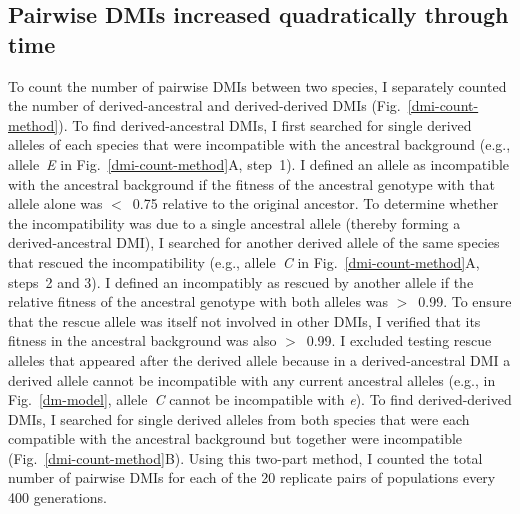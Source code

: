 \begin{doublespace}
\subsection{Pairwise DMIs increased quadratically through time}

To count the number of pairwise DMIs between two species,
I separately counted the number of derived-ancestral
and derived-derived DMIs (Fig.~\ref{dmi-count-method}).
%
To find derived-ancestral DMIs, I first searched
for single derived alleles of each species
that were incompatible with the ancestral background
(e.g., allele~\emph{E} in Fig.~\ref{dmi-count-method}A, step~1).
%
I defined an allele as incompatible with the ancestral background
if the fitness of the ancestral genotype with that allele alone
was $<$~0.75 relative to the original ancestor.
%
To determine whether the incompatibility was due to a single ancestral allele
(thereby forming a derived-ancestral DMI), I searched for another
derived allele of the same species that rescued the incompatibility
(e.g., allele~\emph{C} in Fig.~\ref{dmi-count-method}A, steps~2 and 3).
%
I defined an incompatibly as rescued by another allele if the relative fitness
of the ancestral genotype with both alleles was $>$~0.99.
%
To ensure that the rescue allele was itself not involved in other DMIs,
I verified that its fitness in the ancestral background was also $>$~0.99.
%
I excluded testing rescue alleles that appeared after the derived allele
because in a derived-ancestral DMI a derived allele cannot be incompatible
with any current ancestral alleles (e.g., in Fig.~\ref{dm-model},
allele~\emph{C} cannot be incompatible with \emph{e}).
%
To find derived-derived DMIs, I searched for single derived alleles
from both species that were each compatible with the ancestral background
but together were incompatible (Fig.~\ref{dmi-count-method}B).
%
Using this two-part method, I counted the total number of pairwise DMIs
for each of the 20 replicate pairs of populations every 400 generations.




\end{doublespace}
